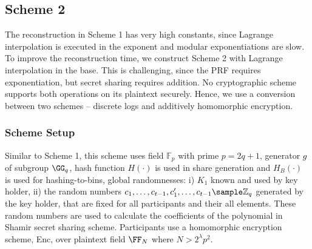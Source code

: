 \subsection{Scheme 2}

The reconstruction in Scheme 1 has very high constants, since Lagrange interpolation is executed in the exponent and modular exponentiations are slow.
To improve the reconstruction time, we construct Scheme 2 with Lagrange interpolation in the base.
This is challenging, since the PRF requires exponentiation, but secret sharing requires addition.
No cryptographic scheme supports both operations on its plaintext securely.
Hence, we use a conversion between two schemes -- discrete logs and additively homomorphic encryption.

\subsubsection{Scheme Setup}
Similar to Scheme 1, this scheme uses field $\mathbb{F}_p$ with prime $p = 2q + 1$, generator $g$ of subgroup $\GG_q$, hash function $H(\cdot)$ is used in share generation and $H_B(\cdot)$ is used for hashing-to-bins, global randomnesses: i) $K_1$ known and used by key holder, ii) the random numbers $c_1, \dots, c_{t-1}, c'_1, \ldots, c_{t-1} \sample \mathbb{Z}_{q}$ generated by the key holder, that are fixed for all participants and their all elements. These random numbers are used to calculate the coefficients of the polynomial in Shamir secret sharing scheme. Participants use a homomorphic encryption scheme, Enc, over plaintext field $\FF_N$ where $N > 2^\lambda p^2$. %
